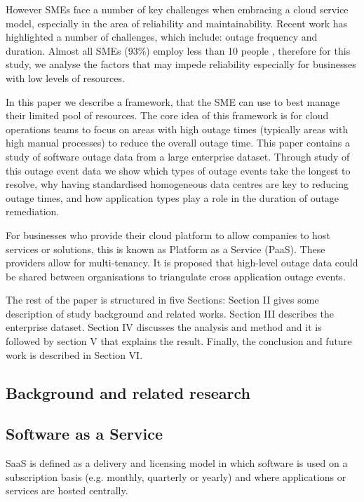 However SMEs face a number of key challenges when embracing a cloud service model, especially in the area of reliability and maintainability. Recent work has highlighted a number of challenges, which include: outage frequency and duration. Almost all SMEs (93\%) employ less than 10 people \cite{europa2015sme}, therefore for this study, we analyse the factors that may impede reliability especially for businesses  with low levels of resources. \par

In this paper we describe a framework, that the SME can use to best manage their limited pool of resources. The core idea of this framework is for cloud operations teams to focus on areas with high outage times (typically areas with high manual processes) to reduce the overall outage time. This paper contains a study of software outage data from a large enterprise dataset. Through study of this outage event data we show which types of outage events take the longest to resolve, why having standardised homogeneous data centres are key to reducing outage times, and how application types play a role in the duration of outage remediation. \par

For businesses who provide their cloud platform to allow companies to host services or solutions, this is known as Platform as a Service (PaaS). These providers allow for multi-tenancy. It is proposed that  high-level outage data could be shared between organisations to triangulate cross application outage events. \par

The rest of the paper is structured in five Sections: Section II gives some description of study background and related works. Section III describes the enterprise dataset. Section IV discusses the analysis and method and it is followed by section V that explains the 
result. Finally, the conclusion and future work is described in Section VI. \par

\subsection{Background and related research}

\subsection{Software as a Service}
SaaS is defined as a delivery and licensing model in which software is used on a subscription basis (e.g. monthly, quarterly or yearly) and where applications or services are hosted centrally. \par

